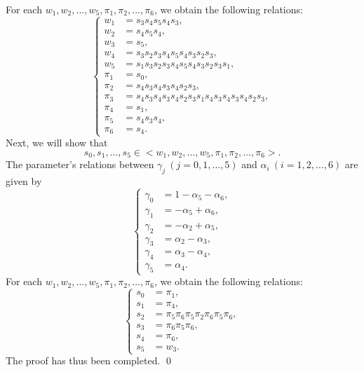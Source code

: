 For each $w_1,w_2,\dots,w_5,\pi_1,\pi_2,\dots,\pi_6$, we obtain the following relations:
\begin{equation}
  \left\{
  \begin{aligned}
   w_1 &=s_3s_4s_5s_4s_3,\\
   w_2 &=s_4s_5s_4,\\
   w_3 &=s_5,\\
   w_4 &=s_3s_2s_3s_4s_5s_4s_3s_2s_3,\\
   w_5 &=s_1s_3s_2s_3s_4s_5s_4s_3s_2s_3s_1,\\
   \pi_1 &=s_0,\\
   \pi_2 &=s_4s_3s_4s_3s_4s_2s_3,\\
   \pi_3 &=s_4s_3s_4s_3s_4s_2s_3s_1s_4s_3s_4s_3s_4s_2s_3,\\
   \pi_4 &=s_1,\\
   \pi_5 &=s_4s_3s_4,\\
   \pi_6 &=s_4.
   \end{aligned}
  \right. 
\end{equation}
Next, we will show that
$$
s_0,s_1,\dots,s_5 \in <w_1,w_2,\dots,w_5,\pi_1,\pi_2,\dots,\pi_6>.
$$
The parameter's relations between $\gamma_j \ (j=0,1,\dots,5)$ and $\alpha_i \ (i=1,2,\dots,6)$ are given by
\begin{equation}
  \left\{
  \begin{aligned}
   \gamma_0 &=1-\alpha_5-\alpha_6,\\
   \gamma_1 &=-\alpha_5+\alpha_6,\\
   \gamma_2 &=-\alpha_2+\alpha_5,\\
   \gamma_3 &=\alpha_2-\alpha_3,\\
   \gamma_4 &=\alpha_3-\alpha_4,\\
   \gamma_5 &=\alpha_4.
   \end{aligned}
  \right. 
\end{equation}
For each $w_1,w_2,\dots,w_5,\pi_1,\pi_2,\dots,\pi_6$, we obtain the following relations:
\begin{equation}
  \left\{
  \begin{aligned}
   s_0 &=\pi_1,\\
   s_1 &=\pi_4,\\
   s_2 &=\pi_5\pi_6\pi_5\pi_2\pi_6\pi_5\pi_6,\\
   s_3 &=\pi_6\pi_5\pi_6,\\
   s_4 &=\pi_6,\\
   s_5 &=w_3.
   \end{aligned}
  \right. 
\end{equation}
The proof has thus been completed. \qed





